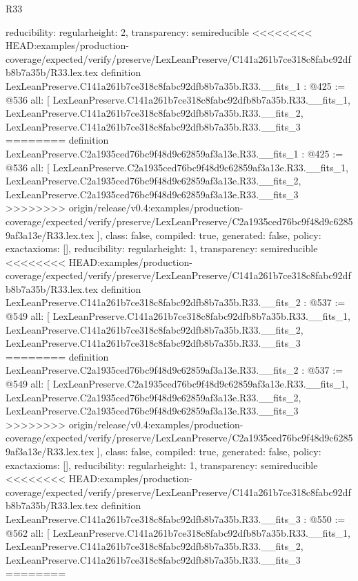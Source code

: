 \begin{lexlean}{R33}
\begin{coremodule}
{{{{{{{{{  reducibility: regular{height: 2},
  transparency: semireducible
}
<<<<<<<< HEAD:examples/production-coverage/expected/verify/preserve/LexLeanPreserve/C141a261b7ce318c8fabc92dfb8b7a35b/R33.lex.tex
definition LexLeanPreserve.C141a261b7ce318c8fabc92dfb8b7a35b.R33.__fits_1 : @425 := @536 {
  all: [
    LexLeanPreserve.C141a261b7ce318c8fabc92dfb8b7a35b.R33.__fits_1,
    LexLeanPreserve.C141a261b7ce318c8fabc92dfb8b7a35b.R33.__fits_2,
    LexLeanPreserve.C141a261b7ce318c8fabc92dfb8b7a35b.R33.__fits_3
========
definition LexLeanPreserve.C2a1935ced76bc9f48d9c62859af3a13e.R33.__fits_1 : @425 := @536 {
  all: [
    LexLeanPreserve.C2a1935ced76bc9f48d9c62859af3a13e.R33.__fits_1,
    LexLeanPreserve.C2a1935ced76bc9f48d9c62859af3a13e.R33.__fits_2,
    LexLeanPreserve.C2a1935ced76bc9f48d9c62859af3a13e.R33.__fits_3
>>>>>>>> origin/release/v0.4:examples/production-coverage/expected/verify/preserve/LexLeanPreserve/C2a1935ced76bc9f48d9c62859af3a13e/R33.lex.tex
  ],
  class: false,
  compiled: true,
  generated: false,
  policy: exact{axioms: []},
  reducibility: regular{height: 1},
  transparency: semireducible
}
<<<<<<<< HEAD:examples/production-coverage/expected/verify/preserve/LexLeanPreserve/C141a261b7ce318c8fabc92dfb8b7a35b/R33.lex.tex
definition LexLeanPreserve.C141a261b7ce318c8fabc92dfb8b7a35b.R33.__fits_2 : @537 := @549 {
  all: [
    LexLeanPreserve.C141a261b7ce318c8fabc92dfb8b7a35b.R33.__fits_1,
    LexLeanPreserve.C141a261b7ce318c8fabc92dfb8b7a35b.R33.__fits_2,
    LexLeanPreserve.C141a261b7ce318c8fabc92dfb8b7a35b.R33.__fits_3
========
definition LexLeanPreserve.C2a1935ced76bc9f48d9c62859af3a13e.R33.__fits_2 : @537 := @549 {
  all: [
    LexLeanPreserve.C2a1935ced76bc9f48d9c62859af3a13e.R33.__fits_1,
    LexLeanPreserve.C2a1935ced76bc9f48d9c62859af3a13e.R33.__fits_2,
    LexLeanPreserve.C2a1935ced76bc9f48d9c62859af3a13e.R33.__fits_3
>>>>>>>> origin/release/v0.4:examples/production-coverage/expected/verify/preserve/LexLeanPreserve/C2a1935ced76bc9f48d9c62859af3a13e/R33.lex.tex
  ],
  class: false,
  compiled: true,
  generated: false,
  policy: exact{axioms: []},
  reducibility: regular{height: 1},
  transparency: semireducible
}
<<<<<<<< HEAD:examples/production-coverage/expected/verify/preserve/LexLeanPreserve/C141a261b7ce318c8fabc92dfb8b7a35b/R33.lex.tex
definition LexLeanPreserve.C141a261b7ce318c8fabc92dfb8b7a35b.R33.__fits_3 : @550 := @562 {
  all: [
    LexLeanPreserve.C141a261b7ce318c8fabc92dfb8b7a35b.R33.__fits_1,
    LexLeanPreserve.C141a261b7ce318c8fabc92dfb8b7a35b.R33.__fits_2,
    LexLeanPreserve.C141a261b7ce318c8fabc92dfb8b7a35b.R33.__fits_3
========
}}}}}}}}}}}
\end{coremodule}
\end{lexlean}
